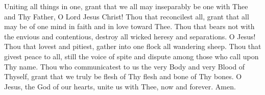 Uniting all things in one, grant that we all 
may inseparably be one with Thee and Thy 
Father, O Lord Jesus Christ! Thou that reconcilest
all, grant that all may be of one mind in 
faith and in love toward Thee. Thou that bears 
not with the envious and contentious, destroy all 
wicked heresy and separations. O Jesus! Thou 
that lovest and pitiest, gather into one flock all
wandering sheep. Thou that givest peace to all, 
still the voice of spite and dispute among those 
who call upon Thy name. Thou who communicatest
to us the very Body and very Blood of 
Thyself, grant that we truly be flesh of Thy 
flesh and bone of Thy bones. O Jesus, the God 
of our hearts, unite us with Thee, now and forever.
Amen.
